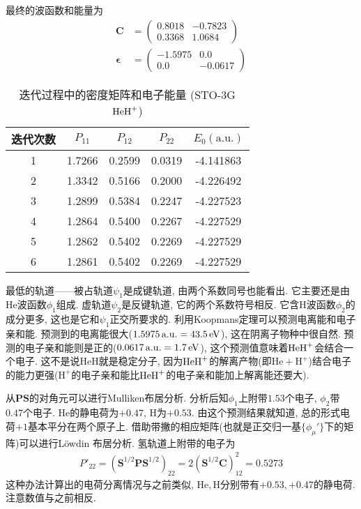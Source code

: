 最终的波函数和能量为
\begin{align}
	\mathbf{C} &= 
	\begin{pmatrix}
		0.8018&-0.7823\\0.3368&1.0684
	\end{pmatrix}\\
	\bm{\epsilon} &= 
	\begin{pmatrix}
		-1.5975&0.0\\0.0&-0.0617
	\end{pmatrix}
\end{align}
\begin{table}[H]
	\centering
	\caption{迭代过程中的密度矩阵和电子能量 (STO-3G $\mathrm{HeH}^+$) }
	\begin{tabular}{ccccc}
		\hline
		迭代次数 & $P_{11}$ & $P_{12}$ & $P_{22}$ & $E_0(\mathrm{a.u.})$ \\ \hline
		1   &  1.7266  &  0.2599  &  0.0319  &      -4.141863       \\
		2   &  1.3342  &  0.5166  &  0.2000  &      -4.226492       \\
		3   &  1.2899  &  0.5384  &  0.2247  &      -4.227523       \\
		4   &  1.2864  &  0.5400  &  0.2267  &      -4.227529       \\
		5   &  1.2862  &  0.5402  &  0.2269  &      -4.227529       \\
		6   &  1.2861  &  0.5402  &  0.2269  &      -4.227529       \\ \hline
	\end{tabular}
	\label{t3.5}
\end{table}
最低的轨道——被占轨道$\psi_1$是成键轨道, 
由两个系数同号也能看出. 
它主要还是由$\mathrm{He}$波函数$\phi_1$组成. 
虚轨道$\psi_2$是反键轨道, 
它的两个系数符号相反. 
它含$\mathrm{H}$波函数$\phi_2$的成分更多, 
这也是它和$\psi_1$正交所要求的. 
利用Koopmans定理可以预测电离能和电子亲和能. 
预测到的电离能很大($1.5975\,\mathrm{a.u.}=43.5 \,\mathrm{eV}$), 
这在阴离子物种中很自然. 
预测的电子亲和能则是正的($0.0617\,\mathrm{a.u.}=1.7\,\mathrm{eV}$), 
这个预测值意味着$\mathrm{HeH}^+$会结合一个电子. 
这不是说$\mathrm{HeH}$就是稳定分子, 
因为$\mathrm{HeH}^+$的解离产物(即$\mathrm{He}+\mathrm{H}^+$)结合电子的能力更强($\mathrm{H}^+$的电子亲和能比$\mathrm{HeH}^+$的电子亲和能加上解离能还要大).


从$\mathbf{PS}$的对角元可以进行Mulliken布居分析. 
分析后知$\phi_1$上附带$1.53$个电子, 
$\phi_2$带$0.47$个电子.
$\mathrm{He}$的静电荷为$+0.47$, 
$\mathrm{H}$为$+0.53$. 
由这个预测结果就知道, 
总的形式电荷$+1$基本平分在两个原子上. 
借助带撇的相应矩阵(也就是正交归一基$\{\phi_\mu'\}$下的矩阵)可以进行L\"owdin 布居分析. 
氢轨道上附带的电子为
\begin{align}
	P'_{22} = (\mathbf{S}^{1/2}\mathbf{PS}^{1/2})_{22} = 2(\mathbf{S}^{1/2}\mathbf{C})^2_{12}=0.5273
\end{align}
这种办法计算出的电荷分离情况与之前类似, 
$\mathrm{He,H}$分别带有$+0.53,+0.47$的静电荷. 
注意数值与之前相反.


